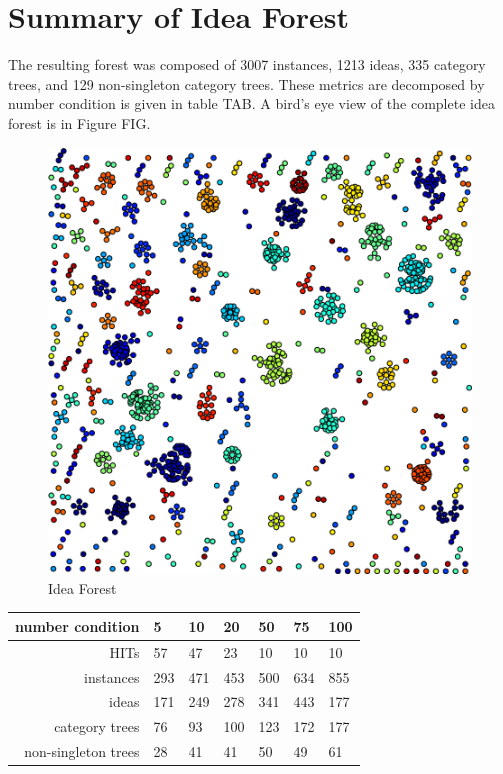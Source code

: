 \section{Summary of Idea Forest}

The resulting forest was composed of 3007 instances, 1213 ideas, 335 category trees, and 129 non-singleton category trees. These metrics are decomposed by number condition is given in table TAB. A bird's eye view of the complete idea forest is in Figure FIG.

\begin{figure}[h!]
    \centering
    \includegraphics[width=0.9\columnwidth]{idea_forest}
    \caption{Idea Forest}
\end{figure}

\begin{table}
	\begin{tabular}[h!]{r | l l l l l l }
	\textbf{number condition} & 5 & 10 & 20 & 50 & 75 & 100 \\ \hline \hline
	HITs & 57 & 47 & 23 & 10 & 10 & 10 \\
	instances & 293 & 471 & 453 & 500 & 634 & 855 \\
	ideas & 171 & 249 & 278 & 341 & 443 & 177 \\
	category trees & 76 & 93 & 100 & 123 & 172 & 177 \\
	non-singleton trees & 28 & 41 & 41 & 50 & 49 & 61 \\
	\end{tabular}
\end{table}

